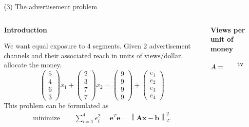 \documentclass[11pt, aspectratio=149]{beamer}
\theoremstyle{plain}
\newcommand{\norm}[1]{\left\lVert#1\right\rVert}
\begin{document}

\begin{frame}[fragile, t]{(3) The advertisement problem}
	\begin{columns}
		\begin{column}{0.6\textwidth}
			\textbf{Introduction}\\ \vspace*{0.5em} 
			
			We want equal exposure to 4 segments.
			Given 2 advertisement channels and their associated reach in units of $\text{views} / \text{dollar}$, allocate the money.
			\begin{equation*}
				\begin{pmatrix}
				5\\ 
				4\\ 
				6\\ 
				3
				\end{pmatrix}
				x_1
				+
				\begin{pmatrix}
				2\\ 
				3\\ 
				7\\ 
				7
				\end{pmatrix}
				x_2
				=
				\begin{pmatrix}
				9 \\ 
				9\\ 
				9\\ 
				9
				\end{pmatrix}
				+
				\begin{pmatrix}
				e_1 \\ 
				e_2\\ 
				e_3\\ 
				e_4
				\end{pmatrix}
			\end{equation*}
			This problem can be formulated as
			\begin{align*}
			\text{minimize } \quad & \sum_{i=1}^{4} e_i^2 
			=  	\mathbf{e}^T \mathbf{e}	= \norm{ \mathbf{A} \mathbf{x} - \mathbf{b} }_2^2.
			\end{align*}
		\end{column}
		\begin{column}{0.4\textwidth}%
			\begin{center}
				\textbf{Views per unit of money}
			\end{center}
			\[
			A = 
			\begin{blockarray}{rcc}
			& \text{tv} & \text{paper}  \\

\end{blockarray}\]
\end{column}
\end{columns}
\end{frame}
\end{document}

